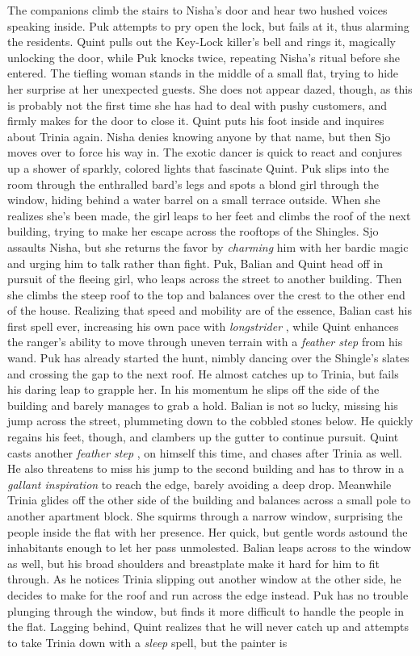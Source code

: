 The companions climb the stairs to Nisha's door and hear two hushed voices speaking inside. Puk attempts to pry open the lock, but fails at it, thus alarming the residents. Quint pulls out the Key-Lock killer's bell and rings it, magically unlocking the door, while Puk knocks twice, repeating Nisha's ritual before she entered. The tiefling woman stands in the middle of a small flat, trying to hide her surprise at her unexpected guests. She does not appear dazed, though, as this is probably not the first time she has had to deal with pushy customers, and firmly makes for the door to close it. Quint puts his foot inside and inquires about Trinia again. Nisha denies knowing anyone by that name, but then Sjo moves over to force his way in. The exotic dancer is quick to react and conjures up a shower of sparkly, colored lights that fascinate Quint. Puk slips into the room through the enthralled bard's legs and spots a blond girl through the window, hiding behind a water barrel on a small terrace outside. When she realizes she's been made, the girl leaps to her feet and climbs the roof of the next building, trying to make her escape across the rooftops of the Shingles. Sjo assaults Nisha, but she returns the favor by {\itshape charming} him with her bardic magic and urging him to talk rather than fight. Puk, Balian and Quint head off in pursuit of the fleeing girl, who leaps across the street to another building. Then she climbs the steep roof to the top and balances over the crest to the other end of the house. Realizing that speed and mobility are of the essence, Balian cast his first spell ever, increasing his own pace with {\itshape longstrider} , while Quint enhances the ranger's ability to move through uneven terrain with a  {\itshape feather step} from his wand. Puk has already started the hunt, nimbly dancing over the Shingle's slates and crossing the gap to the next roof. He almost catches up to Trinia, but fails his daring leap to grapple her. In his momentum he slips off the side of the building and barely manages to grab a hold. Balian is not so lucky, missing his jump across the street, plummeting down to the cobbled stones below. He quickly regains his feet, though, and clambers up the gutter to continue pursuit. Quint casts another  {\itshape feather step} , on himself this time, and chases after Trinia as well. He also threatens to miss his jump to the second building and has to throw in a  {\itshape gallant inspiration} to reach the edge, barely avoiding a deep drop. Meanwhile Trinia glides off the other side of the building and balances across a small pole to another apartment block. She squirms through a narrow window, surprising the people inside the flat with her presence. Her quick, but gentle words astound the inhabitants enough to let her pass unmolested. Balian leaps across to the window as well, but his broad shoulders and breastplate make it hard for him to fit through. As he notices Trinia slipping out another window at the other side, he decides to make for the roof and run across the edge instead. Puk has no trouble plunging through the window, but finds it more difficult to handle the people in the flat. Lagging behind, Quint realizes that he will never catch up and attempts to take Trinia down with a {\itshape sleep} spell, but the painter is 